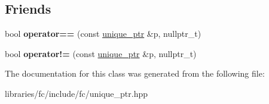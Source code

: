 \subsection*{Friends}
\begin{DoxyCompactItemize}
\item 
\mbox{\label{classfc_1_1unique__ptr_ad52c0c5bd0cbe61c7b4a4efde45efe9f}} 
bool {\bfseries operator==} (const \mbox{\hyperlink{classfc_1_1unique__ptr}{unique\+\_\+ptr}} \&p, nullptr\+\_\+t)
\item 
\mbox{\label{classfc_1_1unique__ptr_acf4806900e0ae47262111250ece21e6e}} 
bool {\bfseries operator!=} (const \mbox{\hyperlink{classfc_1_1unique__ptr}{unique\+\_\+ptr}} \&p, nullptr\+\_\+t)
\end{DoxyCompactItemize}


The documentation for this class was generated from the following file\+:\begin{DoxyCompactItemize}
\item 
libraries/fc/include/fc/unique\+\_\+ptr.\+hpp\end{DoxyCompactItemize}

